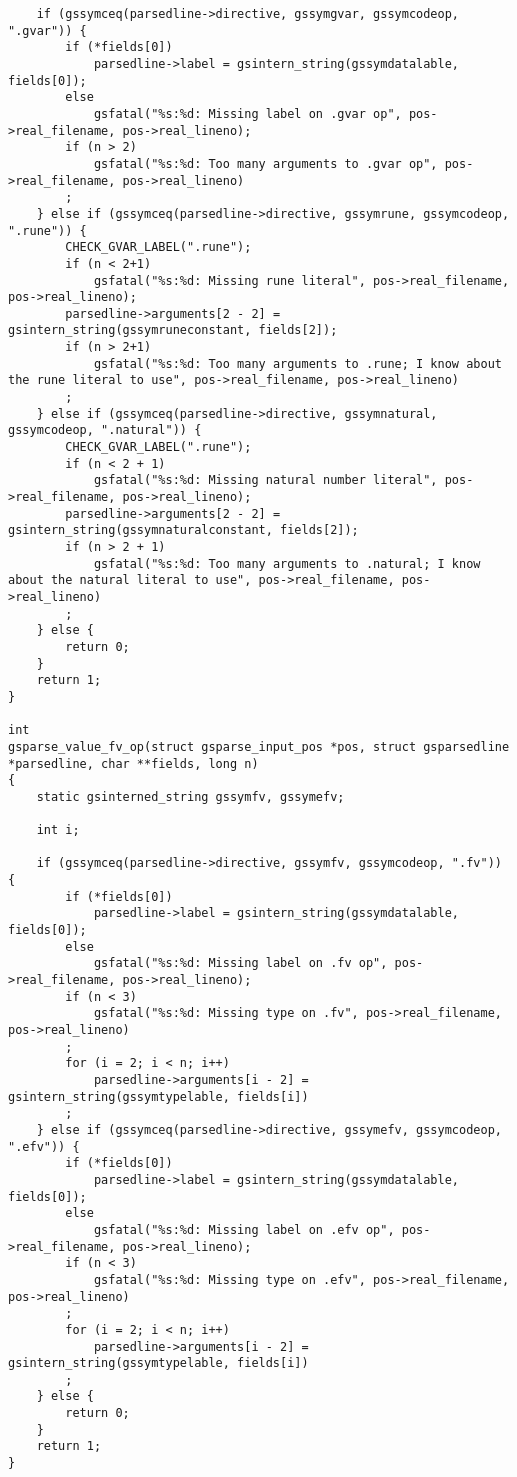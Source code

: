 \documentclass{report}
\begin{document}
\begin{verbatim}
    if (gssymceq(parsedline->directive, gssymgvar, gssymcodeop, ".gvar")) {
        if (*fields[0])
            parsedline->label = gsintern_string(gssymdatalable, fields[0]);
        else
            gsfatal("%s:%d: Missing label on .gvar op", pos->real_filename, pos->real_lineno);
        if (n > 2)
            gsfatal("%s:%d: Too many arguments to .gvar op", pos->real_filename, pos->real_lineno)
        ;
    } else if (gssymceq(parsedline->directive, gssymrune, gssymcodeop, ".rune")) {
        CHECK_GVAR_LABEL(".rune");
        if (n < 2+1)
            gsfatal("%s:%d: Missing rune literal", pos->real_filename, pos->real_lineno);
        parsedline->arguments[2 - 2] = gsintern_string(gssymruneconstant, fields[2]);
        if (n > 2+1)
            gsfatal("%s:%d: Too many arguments to .rune; I know about the rune literal to use", pos->real_filename, pos->real_lineno)
        ;
    } else if (gssymceq(parsedline->directive, gssymnatural, gssymcodeop, ".natural")) {
        CHECK_GVAR_LABEL(".rune");
        if (n < 2 + 1)
            gsfatal("%s:%d: Missing natural number literal", pos->real_filename, pos->real_lineno);
        parsedline->arguments[2 - 2] = gsintern_string(gssymnaturalconstant, fields[2]);
        if (n > 2 + 1)
            gsfatal("%s:%d: Too many arguments to .natural; I know about the natural literal to use", pos->real_filename, pos->real_lineno)
        ;
    } else {
        return 0;
    }
    return 1;
}

int
gsparse_value_fv_op(struct gsparse_input_pos *pos, struct gsparsedline *parsedline, char **fields, long n)
{
    static gsinterned_string gssymfv, gssymefv;

    int i;

    if (gssymceq(parsedline->directive, gssymfv, gssymcodeop, ".fv")) {
        if (*fields[0])
            parsedline->label = gsintern_string(gssymdatalable, fields[0]);
        else
            gsfatal("%s:%d: Missing label on .fv op", pos->real_filename, pos->real_lineno);
        if (n < 3)
            gsfatal("%s:%d: Missing type on .fv", pos->real_filename, pos->real_lineno)
        ;
        for (i = 2; i < n; i++)
            parsedline->arguments[i - 2] = gsintern_string(gssymtypelable, fields[i])
        ;
    } else if (gssymceq(parsedline->directive, gssymefv, gssymcodeop, ".efv")) {
        if (*fields[0])
            parsedline->label = gsintern_string(gssymdatalable, fields[0]);
        else
            gsfatal("%s:%d: Missing label on .efv op", pos->real_filename, pos->real_lineno);
        if (n < 3)
            gsfatal("%s:%d: Missing type on .efv", pos->real_filename, pos->real_lineno)
        ;
        for (i = 2; i < n; i++)
            parsedline->arguments[i - 2] = gsintern_string(gssymtypelable, fields[i])
        ;
    } else {
        return 0;
    }
    return 1;
}


\end{verbatim}
\end{document}
